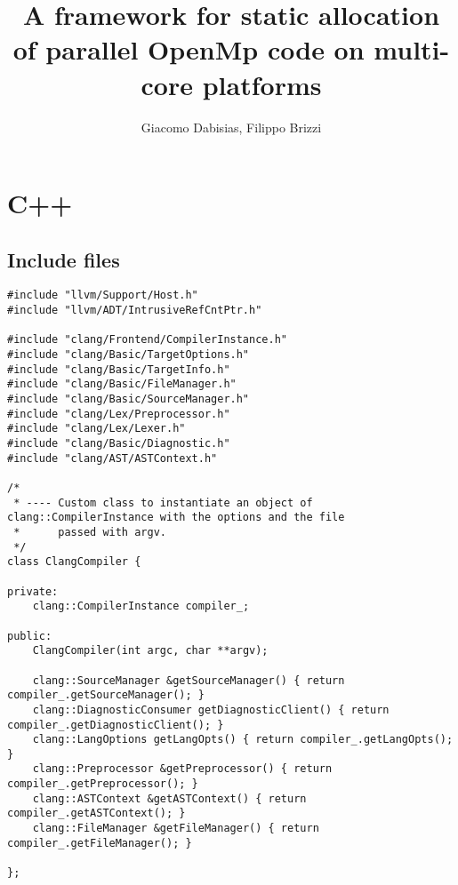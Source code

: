 \documentclass[a4paper,11pt,twoside]{book}
\author{Giacomo Dabisias, Filippo Brizzi}
\title{A framework for static allocation of parallel OpenMp code on multi-core platforms}
\begin{document}
\tableofcontents
\chapter{C++}
\section{Include files}

\begin{lstlisting}[language=CCC, caption=driver/compiler.h]
#include "llvm/Support/Host.h"
#include "llvm/ADT/IntrusiveRefCntPtr.h"

#include "clang/Frontend/CompilerInstance.h"
#include "clang/Basic/TargetOptions.h"
#include "clang/Basic/TargetInfo.h"
#include "clang/Basic/FileManager.h"
#include "clang/Basic/SourceManager.h"
#include "clang/Lex/Preprocessor.h"
#include "clang/Lex/Lexer.h"
#include "clang/Basic/Diagnostic.h"
#include "clang/AST/ASTContext.h"

/*
 * ---- Custom class to instantiate an object of clang::CompilerInstance with the options and the file
 * 		passed with argv.
 */
class ClangCompiler {

private:
	clang::CompilerInstance compiler_;

public:
	ClangCompiler(int argc, char **argv);
	
	clang::SourceManager &getSourceManager() { return compiler_.getSourceManager(); }
	clang::DiagnosticConsumer getDiagnosticClient() { return compiler_.getDiagnosticClient(); }
	clang::LangOptions getLangOpts() { return compiler_.getLangOpts(); }
	clang::Preprocessor &getPreprocessor() { return compiler_.getPreprocessor(); }
	clang::ASTContext &getASTContext() { return compiler_.getASTContext(); }
	clang::FileManager &getFileManager() { return compiler_.getFileManager(); }

};
\end{lstlisting}
\end{document}
